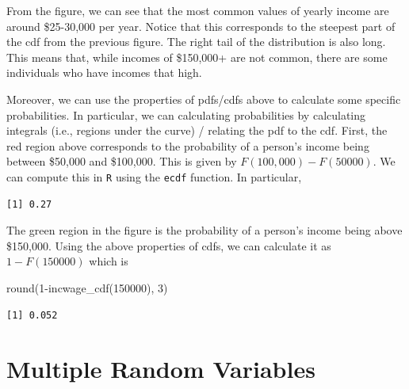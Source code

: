 \documentclass[
  letterpaper,
  DIV=11,
  numbers=noendperiod]{scrreprt}
\newenvironment{Shaded}{\begin{snugshade}}{\end{snugshade}}
\newcommand{\DecValTok}[1]{\textcolor[rgb]{0.68,0.00,0.00}{#1}}
\newcommand{\FunctionTok}[1]{\textcolor[rgb]{0.28,0.35,0.67}{#1}}
\newcommand{\NormalTok}[1]{\textcolor[rgb]{0.00,0.23,0.31}{#1}}
\newcommand{\OtherTok}[1]{\textcolor[rgb]{0.00,0.23,0.31}{#1}}
\newcommand{\SpecialCharTok}[1]{\textcolor[rgb]{0.37,0.37,0.37}{#1}}
\begin{document}
From the figure, we can see that the most common values of yearly income
are around \$25-30,000 per year. Notice that this corresponds to the
steepest part of the cdf from the previous figure. The right tail of the
distribution is also long. This means that, while incomes of \$150,000+
are not common, there are some individuals who have incomes that high.

Moreover, we can use the properties of pdfs/cdfs above to calculate some
specific probabilities. In particular, we can calculating probabilities
by calculating integrals (i.e., regions under the curve) / relating the
pdf to the cdf. First, the red region above corresponds to the
probability of a person's income being between \$50,000 and \$100,000.
This is given by \(F(100,000) - F(50000)\). We can compute this in
\texttt{R} using the \texttt{ecdf} function. In particular,

\begin{Shaded}
\end{Shaded}

\begin{verbatim}
[1] 0.27
\end{verbatim}

The green region in the figure is the probability of a person's income
being above \$150,000. Using the above properties of cdfs, we can
calculate it as \(1-F(150000)\) which is

\begin{Shaded}
\begin{Highlighting}[]
\FunctionTok{round}\NormalTok{(}\DecValTok{1}\SpecialCharTok{{-}}\FunctionTok{incwage\_cdf}\NormalTok{(}\DecValTok{150000}\NormalTok{), }\DecValTok{3}\NormalTok{)}
\end{Highlighting}
\end{Shaded}

\begin{verbatim}
[1] 0.052
\end{verbatim}

\section{Multiple Random Variables}\label{multiple-random-variables}
\end{document}
